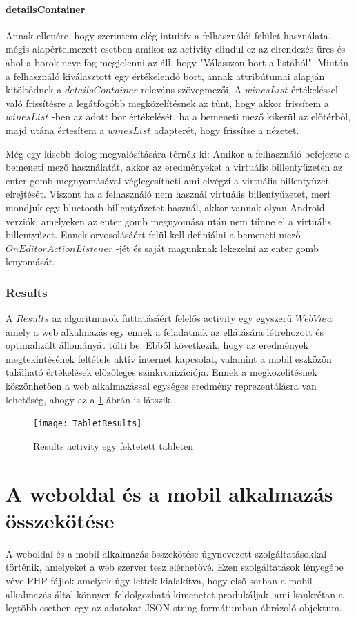 \documentclass[12pt]{report}
\theoremstyle{definition}
\begin{document}
	\subsubsection{detailsContainer}
	Annak ellenére, hogy szerintem elég intuitív a felhasználói felület használata, mégis alapértelmezett esetben amikor az activity elindul ez az elrendezés üres és ahol a borok neve fog megjelenni az áll, hogy "Válasszon bort a listából". Miután a felhasználó kiválasztott egy értékelendő bort, annak attribútumai alapján kitöltődnek a $detailsContainer$ releváns szövegmezői. A $winesList$ értékeléssel való frissítésre a legátfogóbb megközelítésnek az tűnt, hogy akkor frissítem a $winesList$ -ben az adott bor értékelését, ha a bemeneti mező kikerül az előtérből, majd utána értesítem a $winesList$ adapterét, hogy frissítse a nézetet. 
	
	Még egy kisebb dolog megvalósítására térnék ki: Amikor a felhasználó befejezte a bemeneti mező használatát, akkor az eredményeket a virtuális billentyűzeten az enter gomb megnyomásával véglegesítheti ami elvégzi a virtuális billentyűzet elrejtését. Viszont ha a felhasználó nem használ virtuális billentyűzetet, mert mondjuk egy bluetooth billentyűzetet használ, akkor vannak olyan Android verziók, amelyeken az enter gomb megnyomása után nem tűnne el a virtuális billentyűzet. Ennek orvosolásáért felül kell definiálni a bemeneti mező $OnEditorActionListener$ -jét és saját magunknak lekezelni az enter gomb lenyomását.
	
	\subsection{Results}
	A $Results$ az algoritmusok futtatásáért felelős activity egy egyszerű $WebView$ amely a web alkalmazás egy ennek a feladatnak az ellátására létrehozott és optimalizált állományát tölti be. Ebből következik, hogy az eredmények megtekintésének feltétele aktív internet kapcsolat, valamint a mobil eszközön található értékelések előzőleges szinkronizációja. Ennek a megközelítésnek köszönhetően a web alkalmazással egységes eredmény reprezentálásra van lehetőség, ahogy az a \ref{fig:TabletResults} ábrán is látszik.
	\begin{figure}[!ht]
		\centering
		\texttt{[image: TabletResults]}
		\caption[Results activity egy fektetett tableten]{Results activity egy fektetett tableten}
		\label{fig:TabletResults}
	\end{figure}
	
	\chapter{A weboldal és a mobil alkalmazás összekötése}
	A weboldal és a mobil alkalmazás összekötése úgynevezett szolgáltatásokkal történik, amelyeket a web szerver tesz elérhetővé. Ezen szolgáltatások lényegébe véve PHP fájlok amelyek úgy lettek kialakítva, hogy első sorban a mobil alkalmazás által könnyen feldolgozható kimenetet produkáljak, ami konkrétan a legtöbb esetben egy az adatokat JSON string formátumban ábrázoló objektum.
	
\end{document}
